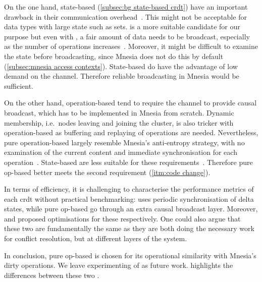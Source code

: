 On the one hand, state-based  (\cref{subsec:bg state-based crdt}) 
have an important drawback in their communication
overhead~\cite{almeida2018DeltaCRDT}. This might not be acceptable for data types 
with large state such as sets.  is a more suitable candidate for our 
purpose but even with , a fair amount
of data needs to be broadcast, especially as the number of operations 
increases~\cite{almeida2018DeltaCRDT}.  Moreover, it might be difficult to 
examine the state before broadcasting, since Mnesia does not do this by 
default (\cref{subsec:mnesia access contexts}).
State-based  do have the advantage of low demand 
on the channel. Therefore reliable broadcasting in Mnesia would be sufficient.
 

On the other hand, operation-based  tend to require the channel
to provide causal broadcast, which has to be implemented in Mnesia from scratch.
Dynamic membership, i.e.\
nodes leaving and joining the cluster, is also tricker with operation-based
 as buffering and replaying of operations are needed. Nevertheless,
pure operation-based \acrshortpl{crdt} largely resemble Mnesia's anti-entropy strategy,
with no examination of the current content and immediate synchronisation
for each operation~\cite{mattsson2009impltxt}. 
State-based  are less suitable for these requirements~\cite{preguica2018CRDT}. 
Therefore pure op-based \acrshortpl{crdt} better meets the second 
requirement (\cref{itm:code change}).

In terms of efficiency, it is challenging to characterise the performance metrics
of each \acrshort{crdt} without practical benchmarking:
 uses periodic synchronisation of delta states, while
pure op-based \acrshortpl{crdt} go through an extra causal broadcast layer.
Moreover, \citet{almeida2018DeltaCRDT} and \citet{baquero2017PureOp}
proposed optimisations for these  respectively. One could
also argue that these two \acrshortpl{crdt} are fundamentally the same as they
are both doing the necessary work for conflict resolution, but at different
layers of the system.

In conclusion, pure op-based  is chosen for its operational
similarity with Mnesia's dirty operations. We leave experimenting of
\acrshortpl{dcrdt} as future work.
 highlights the differences between these 
two \acrshortpl{crdt}.

